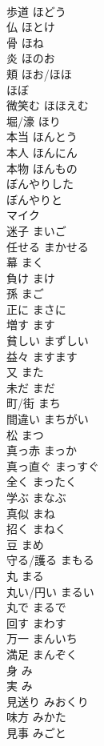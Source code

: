 \documentclass[8pt]{extreport}
\begin{document}
\begin{CJK}{UTF8}{min}
\\	歩道	ほどう	
\\	仏	ほとけ	
\\	骨	ほね	
\\	炎	ほのお	
\\	頬	ほお/ほほ	
\\	ほぼ		
\\	微笑む	ほほえむ	
\\	堀/濠	ほり	
\\	本当	ほんとう	
\\	本人	ほんにん	
\\	本物	ほんもの	
\\	ぼんやりした		
\\	ぼんやりと		
\\	マイク		
\\	迷子	まいご	
\\	任せる	まかせる	
\\	幕	まく	
\\	負け	まけ	
\\	孫	まご	
\\	正に	まさに	
\\	増す	ます	
\\	貧しい	まずしい	
\\	益々	ますます	
\\	又	また	
\\	未だ	まだ	
\\	町/街	まち	
\\	間違い	まちがい	
\\	松	まつ	
\\	真っ赤	まっか	
\\	真っ直ぐ	まっすぐ	
\\	全く	まったく	
\\	学ぶ	まなぶ	
\\	真似	まね	
\\	招く	まねく	
\\	豆	まめ	
\\	守る/護る	まもる	
\\	丸	まる	
\\	丸い/円い	まるい	
\\	丸で	まるで	
\\	回す	まわす	
\\	万一	まんいち	
\\	満足	まんぞく	
\\	身	み	
\\	実	み	
\\	見送り	みおくり	
\\	味方	みかた	
\\	見事	みごと	

\end{CJK}
\end{document}
